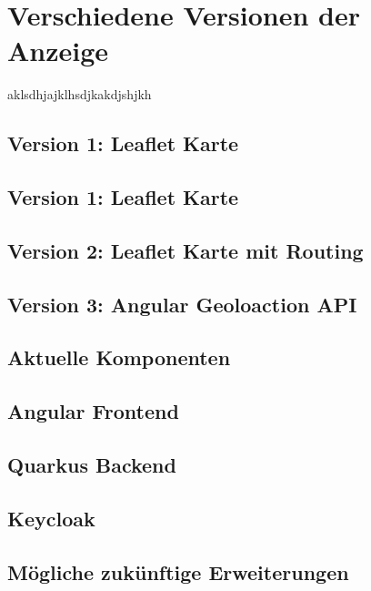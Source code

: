 \section{Verschiedene Versionen der Anzeige}
aklsdhjajklhsdjkakdjshjkh

\begin{spacing}{1}
\subsection{Version 1: Leaflet Karte}
\end{spacing}


\begin{spacing}{1}
\subsection{Version 1: Leaflet Karte}
\end{spacing}


\begin{spacing}{1}
\subsection{Version 2: Leaflet Karte mit Routing}
\end{spacing}

\begin{spacing}{1}
\subsection{Version 3: Angular Geoloaction API}
\end{spacing}

\begin{spacing}{1}
\section{Aktuelle Komponenten}
\end{spacing}

\begin{spacing}{1}
\subsection{Angular Frontend}
\end{spacing}

\begin{spacing}{1}
\section{Quarkus Backend }
\end{spacing}

\begin{spacing}{1}
\section{Keycloak}
\end{spacing}

\begin{spacing}{1}
\section{Mögliche zukünftige Erweiterungen}
\end{spacing}


